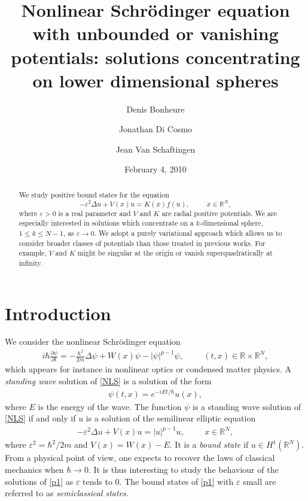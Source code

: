 \documentclass[a4paper]{amsart}
\title[Nonlinear Schr\"odinger equation]{Nonlinear Schr\"odinger equation with unbounded or vanishing potentials: solutions
concentrating on lower dimensional spheres}
\author{Denis Bonheure}
\author{Jonathan Di Cosmo}
\author{Jean Van Schaftingen}
\date{February 4, 2010}
\begin{document}
 

\begin{abstract}
 We study positive bound states for the equation
\[
	- \varepsilon^2 \Delta u + V(x)u = K(x)f(u), \hspace{1cm}  x \in {\mathbb{R}}^N,
\]
where $\varepsilon > 0$ is a real parameter and $V$ and $K$ are radial positive potentials. We are especially interested in
solutions which concentrate on a $k$-dimensional sphere, $1 \leq k \leq N-1$, as $\varepsilon \rightarrow 0$. We adopt a
purely variational approach which allows us to consider broader classes of potentials than those treated in previous
works. For example, $V$ and $K$ might be singular at the origin or vanish superquadratically at infinity.
\end{abstract}

\maketitle

\section{Introduction}
We consider the nonlinear Schr\"odinger equation
\begin{align}\label{NLS}
i \hbar {\frac{\partial {\psi}}{\partial {t}}} = -\frac{\hbar^2}{2m} \Delta \psi + W(x) \psi - {\left| {\psi} \right|}^{p-1}\psi, \hspace{1cm} (t,x) \in {\mathbb{R}}
\times {\mathbb{R}}^N,
\end{align}
which appears for instance in nonlinear optics or condensed matter physics. A \textit{standing wave} solution of
\eqref{NLS} is a solution of the form
\begin{align*}
\psi(t,x) = e^{-iEt/\hbar} u(x),
\end{align*}
where $E$ is the energy of the wave. The function $\psi$ is a standing wave solution of \eqref{NLS} if and only if $u$
is a solution of the semilinear elliptic equation
\begin{align}\label{p1}
 - \varepsilon^2 \Delta u + V(x)u = {\left| {u} \right|}^{p-1}u, \hspace{1cm}  x \in {\mathbb{R}}^N,
\end{align}
 where $\varepsilon^2 = \hbar^2/2m$ and $V(x) = W(x) - E$. It is a \textit{bound state} if $u \in H^1({\mathbb{R}}^N)$. 
From a physical point of view, one expects to recover the laws of classical mechanics when $\hbar \rightarrow 0$. It is
thus interesting to study the behaviour of the solutions of \eqref{p1} as $\varepsilon$ tends to $0$.
The bound states of \eqref{p1} with $\varepsilon$ small are referred to as \textit{semiclassical states}. 
\end{document}
